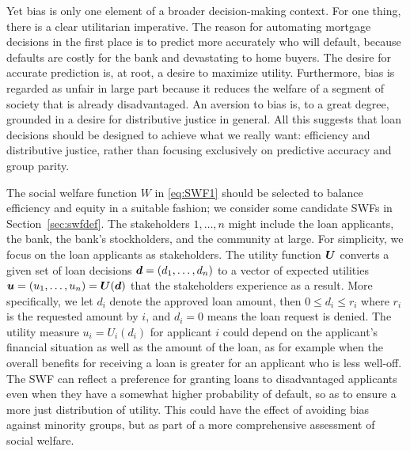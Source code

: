 \documentclass{article}[11pt]
\begin{document}
Yet bias is only one element of a broader decision-making context.  For one thing, there is a clear utilitarian imperative.  The reason for automating mortgage decisions in the first place is to predict more accurately who will default, because defaults are costly for the bank and devastating to home buyers.  The desire for accurate prediction is, at root, a desire to maximize utility.  Furthermore, bias is regarded as unfair in large part because it reduces the welfare of a segment of society that is already disadvantaged.  An aversion to bias is, to a great degree, grounded in a desire for distributive justice in general.  All this suggests that loan decisions should be designed to achieve what we really want: efficiency and distributive justice, rather than focusing exclusively on predictive accuracy and group parity.  

The social welfare function $W$ in \eqref{eq:SWF1} should be selected to balance efficiency and equity in a suitable fashion; we consider some candidate SWFs in Section~\ref{sec:swfdef}.  The stakeholders $1,\ldots, n$ might include the loan applicants, the bank, the bank's stockholders, and the community at large. For simplicity, we focus on the loan applicants as stakeholders. The utility function $\bm{U}$ converts a given set of loan decisions $\bm{d} = (d_1,\ldots,d_n)$ to a vector of expected utilities $\bm{u}=(u_1,\ldots,u_n)=\bm{U}(\bm{d})$ that the stakeholders experience as a result. More specifically, we let $d_i$ denote the approved loan amount, then $0 \leq d_i \leq r_i$ where $r_i$ is the requested amount by $i$, and $d_i = 0$ means the loan request is denied.
The utility measure $u_i=U_i(d_i)$ for applicant $i$ could depend on the applicant's financial situation as well as the amount of the loan, as for example when the overall benefits for receiving a loan is greater for an applicant who is less well-off. The SWF can reflect a preference for granting loans to disadvantaged applicants even when they have a somewhat higher probability of default, so as to ensure a more just distribution of utility.  This could have the effect of avoiding bias against minority groups, but as part of a more comprehensive assessment of social welfare.
\end{document}
